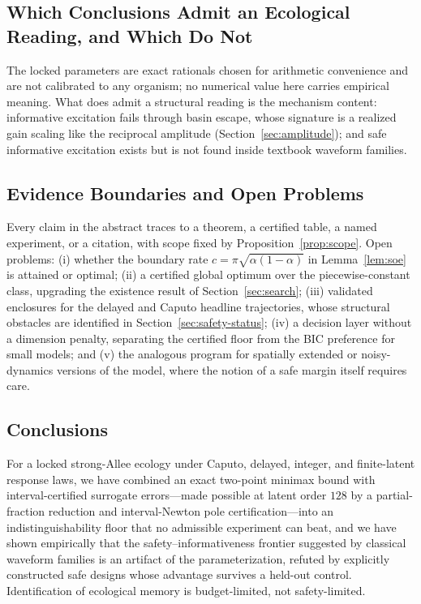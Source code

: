 \documentclass[mathematics,article,accept,pdftex,moreauthors]{Definitions/mdpi}
\begin{document}
\subsection{Which Conclusions Admit an Ecological Reading, and Which Do Not}

The locked parameters are exact rationals chosen for arithmetic convenience and are not calibrated to any organism; no numerical value here carries empirical meaning. What does admit a structural reading is the mechanism content: informative excitation fails through basin escape, whose signature is a realized gain scaling like the reciprocal amplitude (Section~\ref{sec:amplitude}); and safe informative excitation exists but is not found inside textbook waveform families.

\subsection{Evidence Boundaries and Open Problems}

Every claim in the abstract traces to a theorem, a certified table, a named experiment, or a citation, with scope fixed by Proposition~\ref{prop:scope}. Open problems: (i) whether the boundary rate $c=\pi\sqrt{\alpha(1-\alpha)}$ in Lemma~\ref{lem:soe} is attained or optimal; (ii) a certified global optimum over the piecewise-constant class, upgrading the existence result of Section~\ref{sec:search}; (iii) validated enclosures for the delayed and Caputo headline trajectories, whose structural obstacles are identified in Section~\ref{sec:safety-status}; (iv) a decision layer without a dimension penalty, separating the certified floor from the BIC preference for small models; and (v) the analogous program for spatially extended or noisy-dynamics versions of the model, where the notion of a safe margin itself requires care.

\subsection{Conclusions}

For a locked strong-Allee ecology under Caputo, delayed, integer, and finite-latent response laws, we have combined an exact two-point minimax bound with interval-certified surrogate errors---made possible at latent order $128$ by a partial-fraction reduction and interval-Newton pole certification---into an indistinguishability floor that no admissible experiment can beat, and we have shown empirically that the safety--informativeness frontier suggested by classical waveform families is an artifact of the parameterization, refuted by explicitly constructed safe designs whose advantage survives a held-out control. Identification of ecological memory is budget-limited, not safety-limited.
\end{document}
